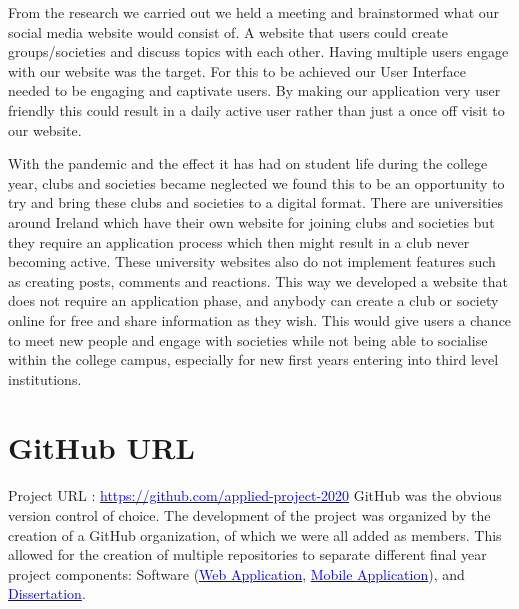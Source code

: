 From the research we carried out we held a meeting and brainstormed what our social media website would consist of. A website that users could create groups/societies and discuss topics with each other. Having multiple users engage with our website was the target. For this to be achieved our User Interface needed to be engaging and captivate users. By making our application very user friendly this could result in a daily active user rather than just a once off visit to our website.
\newline 

With the pandemic and the effect it has had on student life during the college year, clubs and societies became neglected we found this to be an opportunity to try and bring these clubs and societies to a digital format. There are universities around Ireland which have their own website for joining clubs and societies but they require an application process which then might result in a club never becoming active. These university websites also do not implement features such as creating posts, comments and reactions. This way we developed a website that does not require an application phase, and anybody can create a club or society online for free and share information as they wish. This would give users a chance to meet new people and engage with societies while not being able to socialise within the college campus, especially for new first years entering into third level institutions.
\newline

\section{GitHub URL}
Project URL : \href{https://github.com/applied-project-2020}{\textcolor{blue}{https://github.com/applied-project-2020}}
\newline
GitHub was the obvious version control of choice. The development of the project was organized by the creation of a GitHub organization, of which we were all added as members. This allowed for the creation of multiple repositories to separate different final year project components: Software (\href{https://github.com/applied-project-2020/zoosh}{\textcolor{blue}{Web Application}}, \href{https://github.com/applied-project-2020/mobile-application}{\textcolor{blue}{Mobile Application}}), and \href{https://github.com/applied-project-2020/documentation}{\textcolor{blue}{Dissertation}}.

